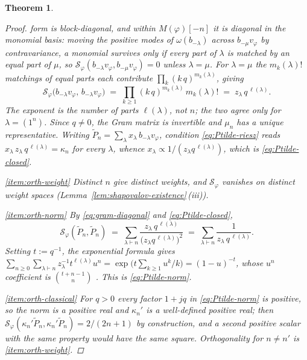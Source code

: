 \documentclass[12pt]{amsart}
\theoremstyle{plain}
\newtheorem{theorem}{Theorem}[section]
\theoremstyle{definition}
\newcommand{\Mf}{M(\varphi)}          %
\newcommand{\Sf}{\mathcal{S}_\varphi} %
\newcommand{\vf}{v_\varphi}           %
\begin{document}
\begin{theorem}
\begin{proof}
form is block-diagonal, and within $\Mf[-n]$ it is diagonal in the
monomial basis: moving the positive modes of $\omega(b_{-\lambda})$ across
$b_{-\mu}\vf$ by contravariance, a monomial survives only if every part of
$\lambda$ is matched by an equal part of $\mu$, so
$\Sf(b_{-\lambda}\vf, b_{-\mu}\vf) = 0$ unless $\lambda = \mu$. For
$\lambda = \mu$ the $m_k(\lambda)!$ matchings of equal parts each
contribute $\prod_k (k\,q)^{m_k(\lambda)}$, giving
\begin{equation}\label{eq:gram-diagonal}
  \Sf\bigl(b_{-\lambda}\vf,\, b_{-\lambda}\vf\bigr)
  \;=\; \prod_{k\ge 1} (k\,q)^{m_k(\lambda)}\,m_k(\lambda)!
  \;=\; z_\lambda\,q^{\,\ell(\lambda)} .
\end{equation}
The exponent is the number of parts $\ell(\lambda)$, not $n$; the two
agree only for $\lambda = (1^n)$.
Since $q \neq 0$, the Gram matrix is invertible and $\mu_n$ has a unique
representative. Writing $\tilde{P}_n = \sum_\lambda x_\lambda\,b_{-\lambda}\vf$,
condition \eqref{eq:Ptilde-riesz} reads
$x_\lambda\,z_\lambda\,q^{\,\ell(\lambda)} = \kappa_n$ for every $\lambda$,
whence $x_\lambda \propto 1/(z_\lambda q^{\,\ell(\lambda)})$, which is
\eqref{eq:Ptilde-closed}.

\ref{item:orth-weight} Distinct $n$ give distinct weights, and $\Sf$
vanishes on distinct weight spaces
(Lemma~\ref{lem:shapovalov-existence}\,(iii)).

\ref{item:orth-norm} By \eqref{eq:gram-diagonal} and
\eqref{eq:Ptilde-closed},
\[
  \Sf(\tilde{P}_n, \tilde{P}_n)
  \;=\; \sum_{\lambda \vdash n}
        \frac{z_\lambda\,q^{\,\ell(\lambda)}}{\bigl(z_\lambda q^{\,\ell(\lambda)}\bigr)^2}
  \;=\; \sum_{\lambda \vdash n} \frac{1}{z_\lambda\,q^{\,\ell(\lambda)}} .
\]
Setting $t := q^{-1}$, the exponential formula gives
$\sum_{n\ge 0}\sum_{\lambda \vdash n} z_\lambda^{-1}t^{\ell(\lambda)}u^n
 = \exp\bigl(t\sum_{k\ge 1}u^k/k\bigr) = (1-u)^{-t}$, whose $u^n$
coefficient is $\binom{t+n-1}{n}$
\cite[Ch.~I, \S 2]{Macdonald1995}. This is \eqref{eq:Ptilde-norm}.

\ref{item:orth-classical} For $q > 0$ every factor $1 + jq$ in
\eqref{eq:Ptilde-norm} is positive, so the norm is a positive real and
$\kappa_n'$ is a well-defined positive real; then
$\Sf(\kappa_n'\tilde{P}_n, \kappa_n'\tilde{P}_n) = 2/(2n+1)$ by
construction, and a second positive scalar with the same property would
have the same square. Orthogonality for $n \neq n'$ is \ref{item:orth-weight}.
\end{proof}
\end{theorem}
\end{document}
